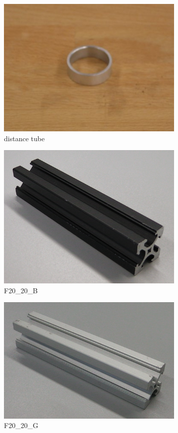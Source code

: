 \begin{figure}
		\vspace{3mm}
		\begin{subfigure}{.3\textwidth}
  			\centering
  			\includegraphics[width=.5\linewidth]{images/distanceTube}
  			\caption{distance tube \cite{github_robocup@work}}
  			\label{fig:distanceTube}
		\end{subfigure}
		\begin{subfigure}{.3\textwidth}
  			\centering
  			\includegraphics[width=.5\linewidth]{images/F20_20_B}
  			\caption{F20\_20\_B \cite{github_robocup@work}}
  			\label{fig:F20_20_B}
		\end{subfigure}
		\begin{subfigure}{.3\textwidth}
  			\centering
  			\includegraphics[width=.5\linewidth]{images/F20_20_G}
  			\caption{F20\_20\_G \cite{github_robocup@work}}
  			\label{fig:F20_20_G}
		\end{subfigure}\\
		\vspace{3mm}
		\begin{subfigure}{.3\textwidth}
  			\centering

\end{subfigure}
\end{figure}
